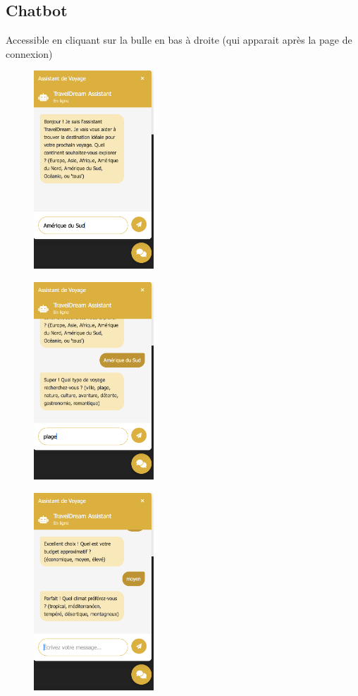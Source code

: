 \documentclass[a4paper,12pt]{article}
\begin{document}
\subsection{Chatbot}
Accessible en cliquant sur la bulle en bas à droite (qui apparait après la page de connexion) 
\begin{figure}[H]
    \centering
    \includegraphics[width=0.4\textwidth]{6_chatbot_1.png}
\end{figure}
\begin{figure}[H]
    \centering
    \includegraphics[width=0.4\textwidth]{6_chatbot_2.png}
\end{figure}
\begin{figure}[H]
    \centering
    \includegraphics[width=0.4\textwidth]{6_chatbot_3.png}
\end{figure}
\end{document}
